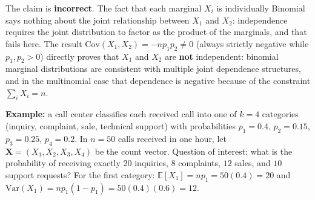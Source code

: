 \begin{solproblema}[prob:81748ff]
	The claim is \textbf{incorrect}. The fact that each marginal $X_i$ is individually Binomial says nothing about the joint relationship between $X_1$ and $X_2$: independence requires the joint distribution to factor as the product of the marginals, and that fails here. The result $\text{Cov}(X_1,X_2)=-np_1p_2 \neq 0$ (always strictly negative while $p_1,p_2>0$) directly proves that $X_1$ and $X_2$ are \textbf{not} independent: binomial marginal distributions are consistent with multiple joint dependence structures, and in the multinomial case that dependence is negative because of the constraint $\sum_i X_i=n$.
\end{solproblema}

\begin{solproblema}[prob:858a3a8]
	\textbf{Example:} a call center classifies each received call into one of $k=4$ categories (inquiry, complaint, sale, technical support) with probabilities $p_1=0.4$, $p_2=0.15$, $p_3=0.25$, $p_4=0.2$. In $n=50$ calls received in one hour, let $\bm{X}=(X_1,X_2,X_3,X_4)$ be the count vector. Question of interest: what is the probability of receiving exactly $20$ inquiries, $8$ complaints, $12$ sales, and $10$ support requests? For the first category: $\mathbb{E}[X_1] = np_1 = 50(0.4) = 20$ and $\text{Var}(X_1) = np_1(1-p_1) = 50(0.4)(0.6) = 12$.
\end{solproblema}
